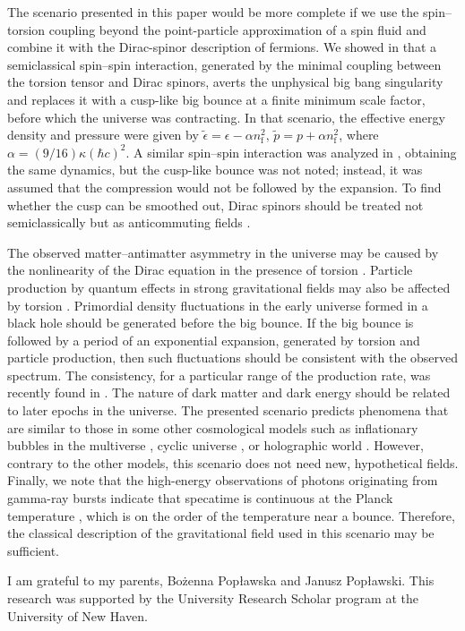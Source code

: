 \documentclass[prd,onecolumn,nofootinbib]{revtex4}
\begin{document}
The scenario presented in this paper would be more complete if we use the spin--torsion coupling beyond the point-particle approximation of a spin fluid \cite{Dir} and combine it with the Dirac-spinor description of fermions.
We showed in \cite{torsion2} that a semiclassical spin--spin interaction, generated by the minimal coupling between the torsion tensor and Dirac spinors, averts the unphysical big bang singularity and replaces it with a cusp-like big bounce at a finite minimum scale factor, before which the universe was contracting.
In that scenario, the effective energy density and pressure were given by $\tilde{\epsilon}=\epsilon-\alpha n_\textrm{f}^2,\,\tilde{p}=p+\alpha n_\textrm{f}^2$, where $\alpha=(9/16)\kappa(\hbar c)^2$.
A similar spin--spin interaction was analyzed in \cite{KR}, obtaining the same dynamics, but the cusp-like bounce was not noted; instead, it was assumed that the compression would not be followed by the expansion.
To find whether the cusp can be smoothed out, Dirac spinors should be treated not semiclassically but as anticommuting fields \cite{Cha}.

The observed matter--antimatter asymmetry in the universe may be caused by the nonlinearity of the Dirac equation in the presence of torsion \cite{dark}.
Particle production by quantum effects in strong gravitational fields may also be affected by torsion \cite{cre}.
Primordial density fluctuations in the early universe formed in a black hole should be generated before the big bounce.
If the big bounce is followed by a period of an exponential expansion, generated by torsion and particle production, then such fluctuations should be consistent with the observed spectrum.
The consistency, for a particular range of the production rate, was recently found in \cite{Sha}.
The nature of dark matter and dark energy should be related to later epochs in the universe.
The presented scenario predicts phenomena that are similar to those in some other cosmological models such as inflationary bubbles in the multiverse \cite{infl}, cyclic universe \cite{ekp}, or holographic world \cite{hol}.
However, contrary to the other models, this scenario does not need new, hypothetical fields.
Finally, we note that the high-energy observations of photons originating from gamma-ray bursts indicate that specatime is continuous at the Planck temperature \cite{cont}, which is on the order of the temperature near a bounce.
Therefore, the classical description of the gravitational field used in this scenario may be sufficient.

I am grateful to my parents, Bo\.{z}enna Pop{\l}awska and Janusz Pop{\l}awski.
This research was supported by the University Research Scholar program at the University of New Haven.
\end{document}
